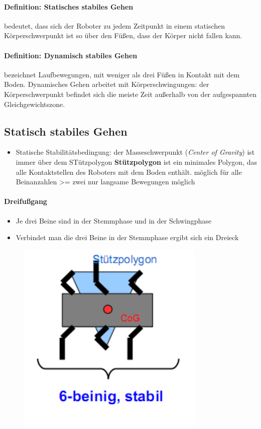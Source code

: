 \paragraph{Definition: Statisches stabiles Gehen}
bedeutet, dass sich der Roboter zu jedem Zeitpunkt in einem statischen Körperschwerpunkt ist so über den Füßen, dass der Körper nicht fallen kann.
\paragraph{Definition: Dynamisch stabiles Gehen}
bezeichnet Laufbewegungen, mit weniger als drei Füßen in Kontakt mit dem Boden.
Dynamisches Gehen arbeitet mit Körperschwingungen: der Körperschwerpunkt befindet sich die meiste Zeit außerhalb von der aufgespannten Gleichgewichtszone.
\subsection{Statisch stabiles Gehen}
\begin{itemize}
	\item Statische Stabilitätsbedingung: der Masseschwerpunkt (\textit{Center of Gravity}) ist immer über dem STützpolygon
	\subitem \textbf{Stützpolygon} ist ein minimales Polygon, das alle Kontaktstellen des Roboters mit dem Boden enthält.
	\subitem möglich für alle Beinanzahlen >= zwei
	\subitem nur langsame Bewegungen möglich	
\end{itemize}
\paragraph{Dreifußgang}
\begin{itemize}
	\item Je drei Beine sind in der Stemmphase und in der Schwingphase
	\item Verbindet man die drei Beine in der Stemmphase ergibt sich ein Dreieck
\end{itemize}
\begin{figure}[H]
	\begin{center}
		\includegraphics[scale=0.6]{Resources/PNG/DreiBein.PNG}
		\caption{}
		\label{fig:Resources/PNG/DreiBein.PNG}
	\end{center}
\end{figure}
